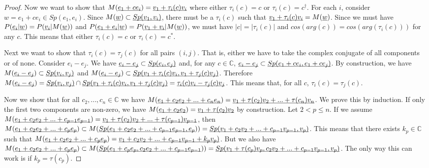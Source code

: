 \documentclass[aps,prl,amsmath,amssymb,twocolumn,nofootinbib]{revtex4}
\theoremstyle{plain}
\theoremstyle{definition}
\theoremstyle{remark}
\newcommand{\pj}[1] {\underbar{$#1$}}
\begin{document}
\begin{proof}
		Now we want to show that $M(\pj{e_1 + c e_i})=\pj{v_1 + \tau_i(c)
			v_i}$ where either $\tau_i(c) = c$ or $\tau_i(c) = c^\dagger$. For
		each $i$, consider $w = e_1 + c e_i \in Sp(e_1, e_i)$. Since
		$M(\pj{w}) \subset \pj{Sp(v_1, v_i)}$, there must be a $\tau_i(c)$
		such that $\pj{v_1 + \tau_i(c) v_i} = M(\pj{w})$. Since we must have
		$P(\pj{e_i} | \pj{w}) = P(\pj{v_i} | M(\pj{w}))$ and $P(\pj{e_1 +
			e_i} | \pj{w}) = P(\pj{v_1 + v_i} | M(\pj{w}))$, we must have
		$|c| = |\tau_i(c)|$ and $cos(arg(c)) = cos(arg(\tau_i(c)))$ for any
		$c$. This means that either $\tau_i(c) = c$ or $\tau_i(c) =
		c^*$.
		
		Next we want to show that $\tau_i(c) = \tau_j(c)$ for all pairs $(i,j)$. That is, either we have to take the complex conjugate of all components or of none. Consider $e_i - e_j$. We have $\pj{e_i - e_j} \subset \pj{Sp(e_i, e_j)}$ and, for any $c \in \mathbb{C}$, $\pj{e_i - e_j} \subset \pj{Sp(e_1 + c e_i, e_1 + c e_j)}$. By construction, we have $M(\pj{e_i - e_j})\subset \pj{Sp(v_i, v_j)}$ and $M(\pj{e_i - e_j})\subset \pj{Sp(v_1 + \tau_i(c) v_i, v_1 + \tau_j(c) v_j)}$. Therefore $M(\pj{e_i - e_j}) = \pj{Sp(v_i, v_j)} \cap \pj{Sp(v_1 + \tau_i(c) v_i, v_1 + \tau_j(c) v_j)} = \pj{\tau_i(c) v_i - \tau_j(c) v_j}$. This means that, for all $c$, $\tau_i(c) = \tau_j(c)$.
		
		Now we show that for all $c_2, ..., c_n \in \mathbb{C}$ we have $M(\pj{e_1 + c_2 e_2 + ... + c_n e_n}) = \pj{v_1 + \tau(c_2) v_2 + ... + \tau(c_n) v_n}$. We prove this by induction. If only the first two components are non-zero, we have  $M(\pj{e_1 + c_2 e_2}) = \pj{v_1 + \tau(c_2) v_2}$ by construction. Let $2 < p \leq n$. If we assume $M(\pj{e_1 + c_2 e_2 + ... + c_{p-1} e_{p-1}}) = \pj{v_1 + \tau(c_2) v_2 + ... + \tau(c_{p-1}) v_{p-1}}$, then $M(\pj{e_1 + c_2 e_2 + ... + c_p e_p}) \subset M(\pj{Sp(e_1 + c_2 e_2 + ... + c_{p-1} e_{p-1}, e_p})) = \pj{Sp(v_1 + c_2 v_2 + ... + c_{p-1} v_{p-1}, v_p)}$. This means that there exists $k_p \in \mathbb{C}$ such that $M(\pj{e_1 + c_2 e_2 + ... + c_p e_p}) = \pj{v_1 + c_2 v_2 + ... + c_{p-1} v_{p-1} + k_p v_p)}$. But we also have $M(\pj{e_1 + c_2 e_2 + ... + c_p e_p}) \subset M(\pj{Sp(e_1 + c_p e_p, c_2 e_2 + ... + c_{p-1} e_{p-1}})) = \pj{Sp(v_1 + \tau(c_p) v_p, c_2 v_2 + ... + c_{p-1} v_{p-1}, v_p)}$. The only way this can work is if $k_p = \tau(c_p)$.
		

\end{proof}
\end{document}
